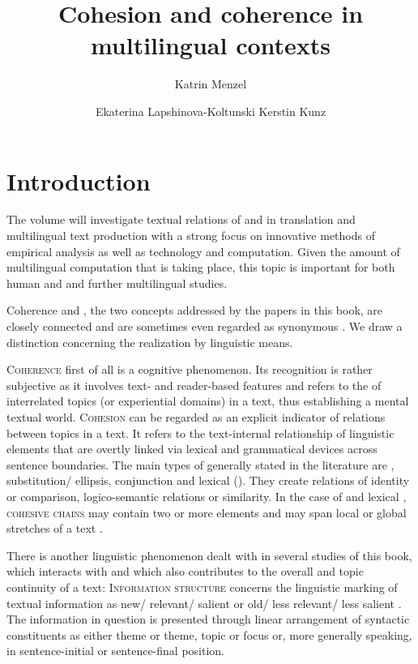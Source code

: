 \documentclass[output=paper]{langsci/langscibook.cls}
\author 
{Katrin Menzel\affiliation{Saarland University}\and
Ekaterina Lapshinova-Koltunski\affiliation{Saarland University}\lastand
Kerstin Kunz\affiliation{Heidelberg University}
}
\title{Cohesion and coherence in multilingual contexts}
\begin{document}
\section{Introduction}
	
The volume will investigate textual relations of  and  in translation and multilingual text production with a strong focus on innovative methods of empirical analysis as well as technology and computation. Given the amount of multilingual computation that is taking place, this topic is important for both human and  and further multilingual studies. 

Coherence and , the two concepts addressed by the papers in this book, are closely connected and are sometimes even regarded as synonymous \citep[see e.g.][]{Brinker2010}. We draw a distinction concerning the realization by linguistic means. 

\textsc{Coherence} first of all is a cognitive phenomenon. Its recognition is rather subjective as it involves text- and reader-based features and refers to the  of interrelated topics (or experiential domains) in a text, thus establishing a mental textual world. \textsc{Cohesion} can be regarded as an explicit indicator of relations between topics in a text. It refers to the text-internal relationship of linguistic elements that are overtly linked via lexical and grammatical devices across sentence boundaries. The main types of  generally stated in the literature are , substitution/ ellipsis, conjunction and lexical  (\citet{HallidayHasan1976}). They create relations of identity or comparison, logico-semantic relations or similarity. In the case of  and lexical , \textsc{cohesive chains} may contain two or more elements and may span local or global stretches of a text \citep{HallidayHasan1976, Widdowson1979}. 

There is another linguistic phenomenon dealt with in several studies of this book, which interacts with  and which also contributes to the overall  and topic continuity of a text: \textsc{Information structure} concerns the linguistic marking of textual information as new/ relevant/ salient or old/ less relevant/ less salient \citep{Krifka2007,Lambrecht1994}. The information in question is presented through linear arrangement of syntactic constituents as either theme or theme, topic or focus or, more generally speaking, in sentence-initial or sentence-final position.
\end{document}
